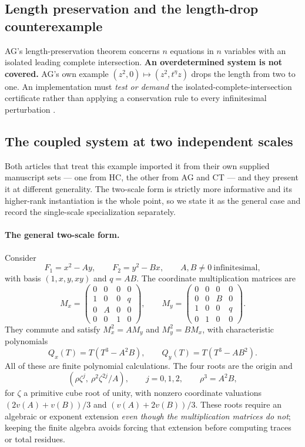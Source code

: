 \documentclass[11pt,letterpaper]{article}
\numberwithin{equation}{section}
\theoremstyle{definition}
\theoremstyle{remark}
\begin{document}
\subsection{Length preservation and the length-drop counterexample}
\label{cas:sub-length}
AG's length-preservation theorem concerns $n$ equations in $n$ variables with an
isolated leading complete intersection. \textbf{An overdetermined system is not
covered.} AG's own example $(z^2,0)\mapsto(z^2,t^\eta z)$ drops the length from
two to one. An implementation must \emph{test or demand} the
isolated-complete-intersection certificate rather than applying a conservation
rule to every infinitesimal perturbation \cite{cas:SourceAG}.

\subsection{The coupled system at two independent scales}
\label{cas:sub-coupled}
Both articles that treat this example imported it from their own supplied
manuscript sets --- one from HC, the other from AG and CT --- and they present
it at different generality. The two-scale form is strictly more informative and
its higher-rank instantiation is the whole point, so we state it as the general
case and record the single-scale specialization separately.

\paragraph{The general two-scale form.}
Consider
\begin{equation}\label{cas:eq-fourexample}
 F_1=x^2-Ay,\qquad F_2=y^2-Bx,\qquad A,B\ne0\ \text{infinitesimal},
\end{equation}
with basis $(1,x,y,xy)$ and $q=AB$. The coordinate multiplication matrices are
\begin{equation}\label{cas:eq-fourmatrices}
 M_x=\begin{pmatrix}0&0&0&0\\1&0&0&q\\0&A&0&0\\0&0&1&0\end{pmatrix},
 \qquad
 M_y=\begin{pmatrix}0&0&0&0\\0&0&B&0\\1&0&0&q\\0&1&0&0\end{pmatrix} .
\end{equation}
They commute and satisfy $M_x^2=AM_y$ and $M_y^2=BM_x$, with characteristic
polynomials
\[
 Q_x(T)=T(T^3-A^2B),\qquad Q_y(T)=T(T^3-AB^2).
\]
All of these are finite polynomial calculations. The four roots are the origin
and
\[
 (\rho\zeta^j,\ \rho^2\zeta^{2j}/A),\qquad j=0,1,2,\qquad \rho^3=A^2B,
\]
for $\zeta$ a primitive cube root of unity, with nonzero coordinate valuations
$(2v(A)+v(B))/3$ and $(v(A)+2v(B))/3$. These roots require an algebraic or
exponent extension \emph{even though the multiplication matrices do not};
keeping the finite algebra avoids forcing that extension before computing traces
or total residues.
\end{document}
